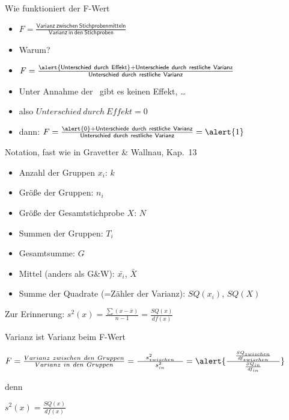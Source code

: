 \begin{frame}
  {Wie funktioniert der F-Wert}
  \begin{itemize}[<+->]
    \item $F=\frac{\mathsf{Varianz\ zwischen\ Stichprobenmitteln}}{\mathsf{Varianz\ in\ den\ Stichproben}}$
    \Zeile
    \item Warum?
    \item $F=\frac{\mathsf{\alert{Unterschied\ durch\ Effekt}+Unterschiede\ durch\ restliche\ Varianz}}{\mathsf{Unterschied\ durch\ restliche\ Varianz}}$
    \Zeile
    \item Unter Annahme der \Null\ gibt es keinen Effekt, \ldots
    \item also \alert{$Unterschied\ durch\ Effekt=0$}
    \Zeile
    \item dann: $F=\frac{\mathsf{\alert{0}+Unterschiede\ durch\ restliche\ Varianz}}{\mathsf{Unterschied\ durch\ restliche\ Varianz}}=\alert{1}$
  \end{itemize}
\end{frame}

\begin{frame}
  {Notation, fast wie in Gravetter \& Wallnau, Kap.~13}
  \begin{itemize}[<+->]
    \item Anzahl der Gruppen \alert{$x_i$}: \alert{$k$}
    \item Größe der Gruppen: \alert{$n_i$}
    \item Größe der Gesamtstichprobe \alert{$X$}: \alert{$N$}
    \item Summen der Gruppen: \alert{$T_i$}
    \item Gesamtsumme: \alert{$G$}
    \item Mittel (anders als G\&W): \alert{$\bar{x_i}$}, \alert{$\bar{X}$}
    \item Summe der Quadrate (=Zähler der Varianz): \alert{$SQ(x_i)$}, \alert{$SQ(X)$}
  \end{itemize}
  \pause
  \vspace{0.5cm}
  Zur Erinnerung: $s^2(x)=\frac{\sum (x-\bar{x})}{n-1}=\frac{SQ(x)}{df(x)}$\\
\end{frame}

\begin{frame}
  {Varianz ist Varianz beim F-Wert}
  \begin{center}
    $F=\frac{Varianz\ zwischen\ den\ Gruppen}{Varianz\ in\ den\ Gruppen}=\frac{\ \ \ s^2_{zwischen}\ \ \ }{s^2_{in}}=\alert{\frac{\ \ \ \frac{SQ_{zwischen}}{df_{zwischen}}\ \ \ }{\frac{SQ_{in}}{df_{in}}}}$\\
    \vspace{0.5cm}

    denn\\
    \vspace{0.5cm}

    $s^2(x)=\frac{SQ(x)}{df(x)}$
  \end{center}
\end{frame}

